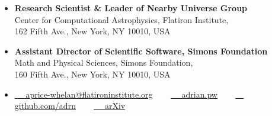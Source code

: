 \documentclass[12pt, letterpaper]{apw-cv}
\begin{document}
\thispagestyle{empty}\sloppy\sloppypar




\begin{itemize}
  \item
    \textbf{Research Scientist \& Leader of Nearby Universe Group} \\
    Center for Computational Astrophysics, Flatiron Institute, \\
    162 Fifth Ave., New York, NY 10010, USA
  \item \textbf{Assistant Director of Scientific Software, Simons Foundation}\\
    Math and Physical Sciences, Simons Foundation, \\
    160 Fifth Ave., New York, NY 10010, USA
  \item
    \href{mailto:aprice-whelan@flatironinstitute.org}{\faEnvelope ~~ aprice-whelan@flatironinstitute.org}
    ~~~
	\href{http://adrian.pw}{\faExternalLink* ~~ adrian.pw}
    ~~~
	\href{https://github.com/adrn}{\faGithub ~~ github.com/adrn}
    ~~~
    \href{\arxivurl}{\faFile ~~ arXiv}
\end{itemize}


\end{document}
